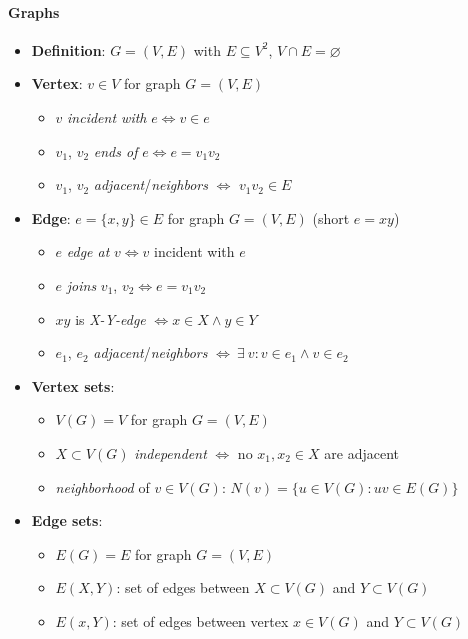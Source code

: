 \paragraph{Graphs}
\begin{itemize}
  \item \textbf{Definition}: $ G = (V,E) $ with  $ E \subseteq V^2 $, $ V \cap E = \varnothing $
  \item \textbf{Vertex}: $ v \in V $ for graph $ G = (V,E) $
  \begin{itemize}
    \item $ v $ \emph{incident with} $ e \Leftrightarrow v \in e $  
    \item $ v_1 $, $ v_2 $ \emph{ends of} $ e \Leftrightarrow e = v_1v_2 $
    \item $ v_1 $, $ v_2 $ \emph{adjacent}/\emph{neighbors} $ \Leftrightarrow $ $ v_1v_2 \in E $
  \end{itemize}
  \item \textbf{Edge}: $ e = \{ x,y \} \in E $ for graph $ G = (V,E) $ (short $ e = xy $)
  \begin{itemize}
    \item $ e $ \emph{edge at} $ v \Leftrightarrow v $ incident with $ e $
    \item $ e $ \emph{joins} $ v_1 $, $ v_2 \Leftrightarrow e = v_1v_2 $
    \item $ xy $ is \emph{X-Y-edge} $ \Leftrightarrow x \in X \wedge y \in Y $
    \item $ e_1 $, $ e_2 $ \emph{adjacent}/\emph{neighbors} $ \Leftrightarrow \ \exists \ v: v \in e_1 \wedge v \in e_2 $
  \end{itemize}
  \item \textbf{Vertex sets}:
  \begin{itemize}
    \item $ V(G) = V $ for graph $ G = (V,E) $
    \item $ X \subset V(G) $ \emph{independent} $ \Leftrightarrow $ no $ x_1, x_2 \in X $ are adjacent
    \item \emph{neighborhood} of $ v \in V(G) $: $ N(v) = \{ u \in V(G) : uv \in E(G) \} $
  \end{itemize}
  \item \textbf{Edge sets}:
  \begin{itemize}
    \item $ E(G) = E $ for graph $ G = (V,E) $
    \item $ E(X,Y) $: set of edges between $ X \subset V(G) $ and $ Y \subset V(G) $
    \item $ E(x,Y) $: set of edges between vertex $ x \in V(G) $ and $ Y \subset V(G) $ 

\end{itemize}
\end{itemize}
